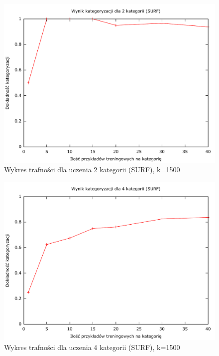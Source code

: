 \begin{figure}[h]
	\centering
	\includegraphics[scale=0.8]{graphics/04_interpretacja_wynikow/result-surf-2.pdf}
	\caption{ Wykres trafności dla uczenia 2 kategorii (SURF), k=1500 }
	\label{fig:result-surf-2}
\end{figure}

\begin{figure}[h]
	\centering
	\includegraphics[scale=0.8]{graphics/04_interpretacja_wynikow/result-surf-4.pdf}
	\caption{ Wykres trafności dla uczenia 4 kategorii (SURF), k=1500 }
	\label{fig:result-surf-4}
\end{figure}

